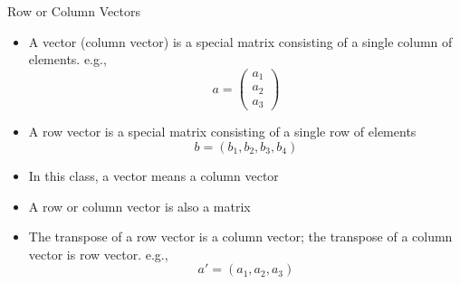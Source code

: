 \documentclass[
  ignorenonframetext,
]{beamer}
\providecommand{\tightlist}{%
  \setlength{\itemsep}{0pt}\setlength{\parskip}{0pt}}
\begin{document}
\begin{frame}{Row or Column Vectors}
\protect\hypertarget{row-or-column-vectors}{}
\begin{itemize}
\tightlist
\item
  A vector (column vector) is a special matrix consisting of a single
  column of elements. e.g.,
  \[a=\begin{pmatrix}a_1\\ a_2 \\ a_3\end{pmatrix}\]
\item
  A row vector is a special matrix consisting of a single row of
  elements \[b=(b_1, b_2, b_3, b_4)\]
\item
  In this class, a vector means a column vector
\item
  A row or column vector is also a matrix
\item
  The transpose of a row vector is a column vector; the transpose of a
  column vector is row vector. e.g., \[a'=(a_1,a_2,a_3)\]
\end{itemize}
\end{frame}
\end{document}
